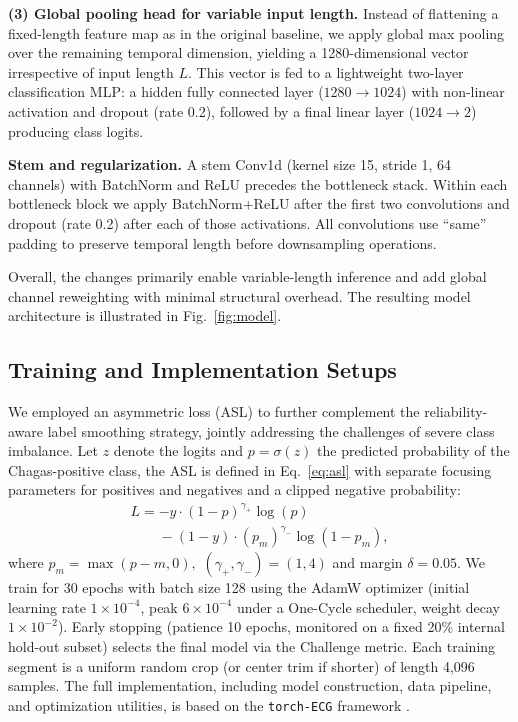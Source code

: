 \documentclass[twocolumn]{cinc}
\begin{document}
\textbf{(3) Global pooling head for variable input length.} Instead of flattening a fixed-length feature map as in the original baseline, we apply global max pooling over the remaining temporal dimension, yielding a 1280-dimensional vector irrespective of input length $L$. This vector is fed to a lightweight two-layer classification MLP: a hidden fully connected layer ($1280 \to 1024$) with non-linear activation and dropout (rate 0.2), followed by a final linear layer ($1024 \to 2$) producing class logits.

\textbf{Stem and regularization.} A stem Conv1d (kernel size 15, stride 1, 64 channels) with BatchNorm and ReLU precedes the bottleneck stack. Within each bottleneck block we apply BatchNorm+ReLU after the first two convolutions and dropout (rate 0.2) after each of those activations. All convolutions use “same” padding to preserve temporal length before downsampling operations.

Overall, the changes primarily enable variable-length inference and add global channel reweighting with minimal structural overhead. The resulting model architecture is illustrated in Fig.~\ref{fig:model}.


\subsection{Training and Implementation Setups}
\label{subsec:train}


We employed an asymmetric loss (ASL) \cite{ridnik2021asymmetric_loss} to further complement the reliability-aware label smoothing strategy, jointly addressing the challenges of severe class imbalance. Let $z$ denote the logits and $p=\sigma(z)$ the predicted probability of the Chagas-positive class, the ASL is defined in Eq.~\ref{eq:asl} with separate focusing parameters for positives and negatives and a clipped negative probability:
\begin{equation}
\label{eq:asl}
\begin{multlined}
L = -y \cdot (1-p)^{\gamma_{+}} \log(p) \\
\phantom{L = } - (1-y) \cdot (p_m)^{\gamma_{-}} \log(1-p_m),
\end{multlined}
\end{equation}
where $p_m = \max(p - m, 0),$ $(\gamma_{+},\gamma_{-})=(1,4)$ and margin $\delta=0.05$. We train for 30 epochs with batch size 128 using the AdamW optimizer (initial learning rate $1\times10^{-4}$, peak $6\times10^{-4}$ under a One-Cycle scheduler, weight decay $1\times10^{-2}$). Early stopping (patience 10 epochs, monitored on a fixed 20\% internal hold-out subset) selects the final model via the Challenge metric. Each training segment is a uniform random crop (or center trim if shorter) of length 4,096 samples. The full implementation, including model construction, data pipeline, and optimization utilities, is based on the \texttt{torch-ECG} framework \cite{torch_ecg_paper}.
\end{document}
